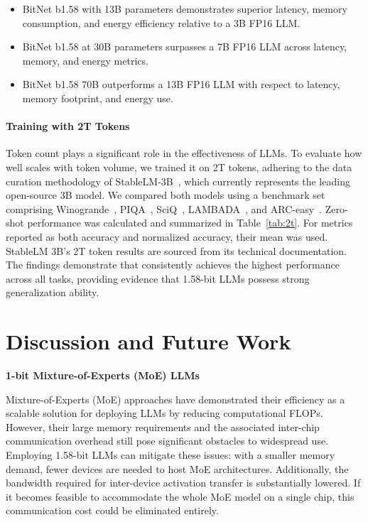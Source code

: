 \begin{itemize}
    \item BitNet b1.58 with 13B parameters demonstrates superior latency, memory consumption, and energy efficiency relative to a 3B FP16 LLM.
    \item BitNet b1.58 at 30B parameters surpasses a 7B FP16 LLM across latency, memory, and energy metrics.
    \item BitNet b1.58 70B outperforms a 13B FP16 LLM with respect to latency, memory footprint, and energy use.
\end{itemize}

\paragraph{Training with 2T Tokens}

Token count plays a significant role in the effectiveness of LLMs. To evaluate how well  scales with token volume, we trained it on 2T tokens, adhering to the data curation methodology of StableLM-3B~\cite{StableLM-3B-4E1T}, which currently represents the leading open-source 3B model. We compared both models using a benchmark set comprising Winogrande~\cite{winoGrande}, PIQA~\cite{piqa}, SciQ~\cite{sciq}, LAMBADA~\cite{lambada}, and ARC-easy~\cite{arc}. Zero-shot performance was calculated and summarized in Table~\ref{tab:2t}. For metrics reported as both accuracy and normalized accuracy, their mean was used. StableLM 3B’s 2T token results are sourced from its technical documentation. The findings demonstrate that  consistently achieves the highest performance across all tasks, providing evidence that 1.58-bit LLMs possess strong generalization ability.

\section{Discussion and Future Work}

\textbf{1-bit Mixture-of-Experts (MoE) LLMs}

Mixture-of-Experts (MoE) approaches have demonstrated their efficiency as a scalable solution for deploying LLMs by reducing computational FLOPs. However, their large memory requirements and the associated inter-chip communication overhead still pose significant obstacles to widespread use. Employing 1.58-bit LLMs can mitigate these issues: with a smaller memory demand, fewer devices are needed to host MoE architectures. Additionally, the bandwidth required for inter-device activation transfer is substantially lowered. If it becomes feasible to accommodate the whole MoE model on a single chip, this communication cost could be eliminated entirely.

